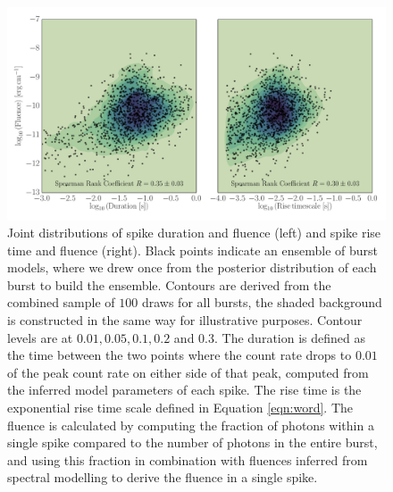 \documentclass[12pt]{emulateapj}
\begin{document}
\begin{figure}[htbp]
\begin{center}
\includegraphics[width=\textwidth]{f7.pdf}%
\caption{Joint distributions of spike duration and fluence (left) and spike rise time and fluence (right). Black points indicate an ensemble of burst models, where we drew once
from the posterior distribution of each burst to build the ensemble. Contours are derived from the combined sample of $100$ draws for all bursts, the shaded background is constructed in
the same way for illustrative purposes. Contour levels are at $0.01, 0.05, 0.1, 0.2$ and $0.3$.
The duration is defined as the time between the two points where
the count rate drops to $0.01$ of the peak count rate on either side of that peak, computed from the inferred model parameters of each spike. The rise time is the exponential
rise time scale defined in Equation \ref{eqn:word}. The fluence is calculated by computing the fraction of photons within a single spike compared to the number of photons in the
entire burst, and using
this fraction in combination with fluences inferred from spectral modelling \citep{vanderhorst2012,vonkienlin2012} to derive the fluence in a single spike.}
\label{fig:correlations}
\end{center}
\end{figure}
\end{document}
